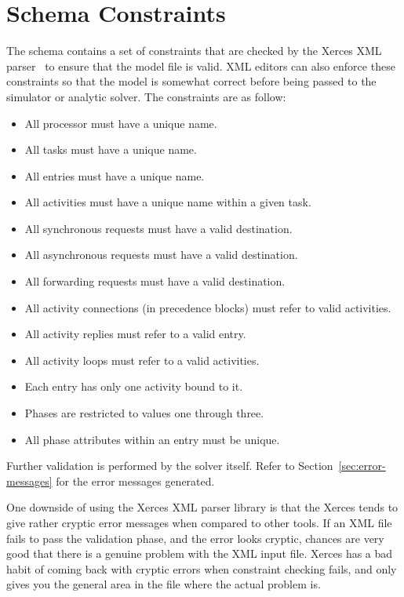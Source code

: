 \section{Schema Constraints}
\label{sec:schema-constraints}

The schema contains a set of constraints
that are checked by the Xerces XML
parser~\cite{sw:xerces} to ensure that the model file is
valid.  XML editors can also enforce these constraints so that the
model is somewhat correct before being passed to the simulator or
analytic solver.  The constraints are as follow:
\begin{itemize}
\item All processor must have a unique name.
\item All tasks must have a unique name.
\item All entries must have a unique name.
\item All activities must have a unique name within a given task.
\item All synchronous requests must have a valid destination.
\item All asynchronous requests must have a valid destination.
\item All forwarding requests must have a valid destination.
\item All activity connections (in precedence blocks) must refer to
  valid activities.
\item All activity replies must refer to a valid entry.
\item All activity loops must refer to a valid activities.
\item Each entry has only one activity bound to it.
\item Phases are restricted to values one through three.
\item All phase attributes within an
  entry must be unique.
\end{itemize}
Further validation is performed by the solver itself.  Refer to
Section~\ref{sec:error-messages} for the error messages generated.

One downside of using the Xerces XML
parser library is that the Xerces tends to give rather cryptic error
messages when compared to other tools.  If an XML file fails to pass
the validation phase, and the error looks cryptic, chances are very
good that there is a genuine problem with the XML input file.  Xerces
has a bad habit of coming back with cryptic errors when constraint
checking fails, and only gives you the
general area in the file where the actual problem is.

